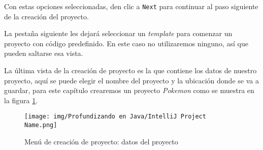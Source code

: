   Con estas opciones seleccionadas, den clic a \texttt{Next} para continuar al paso 
  siguiente de la creación del proyecto.

  La pestaña siguiente les dejará seleccionar un \textit{template} para comenzar un 
  proyecto con código predefinido.
  En este caso no utilizaremos ninguno, así que pueden saltarse esa vista.

  La última vista de la creación de proyecto es la que contiene los datos de nuestro proyecto, 
  aquí se puede elegir el nombre del proyecto y la ubicación donde se va a guardar, para este 
  capítulo crearemos un proyecto \textit{Pokemon} como se muestra en la figura 
  \ref{fig:intellij-project-3}.
  
  \begin{figure}[ht!]
    \centering
    \texttt{[image: img/Profundizando en Java/IntelliJ Project Name.png]}
    \caption{Menú de creación de proyecto: datos del proyecto}
    \label{fig:intellij-project-3}
  \end{figure}
%